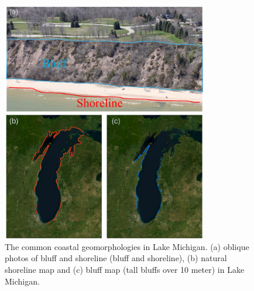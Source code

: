 \begin{figure}[htbp]
  \centering
  \includegraphics[width=0.8\textwidth]{chapter1/resources/figure1-1.jpg}
  \caption{The common coastal geomorphologies in Lake Michigan. (a) oblique photos of bluff and shoreline (bluff and shoreline), (b) natural shoreline map and (c) bluff map (tall bluffs over 10 meter) in Lake Michigan.}
  \label{fig:fig1.1}
\end{figure}

